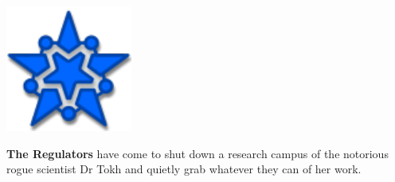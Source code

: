 \bigskip
\noindent\begin{minipage}{1.0\linewidth}\centering
  \begin{minipage}[c]{1in}
    \includegraphics[width=\linewidth]{art/icons/regulators.pdf}
  \end{minipage}\quad
  \begin{minipage}[c]{4in}
    \textbf{The Regulators} have come to shut down a research campus
    of the notorious rogue scientist Dr Tokh and quietly grab whatever
    they can of her work.
  \end{minipage}\quad
  \begin{minipage}[c]{1in}~
  \end{minipage}

  \vspace{-9pt}
  

\end{minipage}
